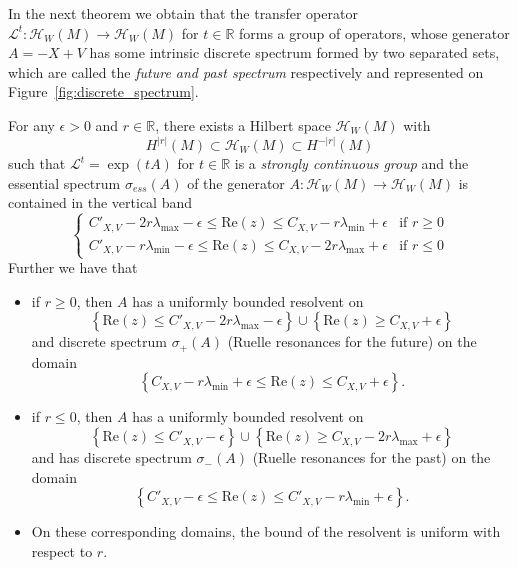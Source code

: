 \documentclass[AHL,Unicode,longabstracts,published]{cedram}
\newcommand{\clH}{\mathcal{H}}
\newcommand{\clL}{\mathcal{L}}
\newcommand{\Ree}{\mathrm{Re}}
\newcommand{\bbR}{\mathbb{R}}
\newcommand{\Ree}{\mathrm{Re}}
\newcommand{\clH}{\mathcal{H}}
\newcommand{\bbR}{\mathbb{R}}
\begin{document}
In the next theorem we obtain that the transfer operator $\clL^{t}:\clH _{W}\left(M\right)\rightarrow\clH _{W}\left(M\right)$ for $t\in\bbR$ forms a group of operators, whose generator $A=-X+V$ has some intrinsic discrete spectrum formed by two separated sets, which are called the \emph{future and past spectrum} respectively and represented on Figure~\ref{fig:discrete_spectrum}.
\begin{cBoxB}{}
\begin{theo}\label{thm:grey-band}
For any $\epsilon>0$ and $r\in\bbR$, there exists a Hilbert space $\clH _{W}(M)$ with
\[
H^{|r|}\left(M\right)\subset\clH _{W}\left(M\right)\subset H^{-|r|}\left(M\right)
\]
such that $\clL^{t}=\exp(tA)$ for $t\in\bbR$ is a \emph{strongly continuous group} and the essential spectrum $\sigma_{ess}(A)$ of the generator $A:\clH _{W}(M)\rightarrow\clH _{W}\left(M\right)$ is contained in the vertical band
\begin{equation}
\begin{cases}
C'_{X,V}-2r\lambda_{\max}-\epsilon\leq\Ree\left(z\right)\leq C_{X,V}-r\lambda_{\min}+\epsilon & \text{if }r\ge0\\
C'_{X,V}-r\lambda_{\min}-\epsilon\leq\Ree\left(z\right)\leq C_{X,V}-2r\lambda_{\max}+\epsilon & \text{if }r\le0
\end{cases}\label{eq:bound_for_ess_spec}
\end{equation}
Further we have that
\begin{itemize}
\item if $r\geq0$, then $A$ has a uniformly bounded resolvent on
\[
\left\{ \Ree\left(z\right)\leq C'_{X,V}-2r\lambda_{\max}-\epsilon\right\} \cup\left\{ \Ree\left(z\right)\geq C_{X,V}+\epsilon\right\}
\]
and discrete spectrum $\sigma_{+}\left(A\right)$ (Ruelle resonances for the future) on the domain
\[
\left\{C_{X,V}-r\lambda_{\min}+\epsilon\leq\Ree\left(z\right)\leq C_{X,V}+\epsilon\right\}.
\]
\item if $r\leq0$, then $A$ has a uniformly bounded resolvent on
\[
\left\{ \Ree\left(z\right)\leq C'_{X,V}-\epsilon\right\} \cup\left\{ \Ree\left(z\right)\geq C_{X,V}-2r\lambda_{\max}+\epsilon\right\}
\]
and has discrete spectrum $\sigma_{-}\left(A\right)$ (Ruelle resonances for the past) on the domain
\[
\left\{C'_{X,V}-\epsilon\leq\Ree\left(z\right)\leq C'_{X,V}-r\lambda_{\min}+\epsilon\right\}.
\]
\item On these corresponding domains, the bound of the resolvent is uniform with respect to $r$.
\end{itemize}
\end{theo}
\end{cBoxB}
\end{document}
